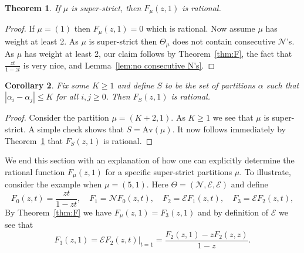 \documentclass{article}
\theoremstyle{plain}
\newtheorem{theorem}{Theorem}[section]
\newtheorem{corollary}[theorem]{Corollary}
\theoremstyle{definition}
\newcommand{\Av}{\text{Av}}
\newcommand{\N}{\mathcal{N}}
\newcommand{\E}{\mathcal{E}}
\begin{document}



\begin{theorem}\label{thm:rational}
	If $\mu$ is super-strict, then $F_\mu(z,1)$ is rational.  
\end{theorem}

\begin{proof}
	If $\mu=(1)$ then $F_\mu(z,1) = 0$ which is rational.  Now assume $\mu$ has weight at least 2.  As $\mu$ is super-strict then $\Theta_\mu$ does not contain consecutive $\N$'s.  As $\mu$ has weight at least 2, our claim follows by Theorem~\ref{thm:F}, the fact that $\frac{zt}{1-zt}$ is very nice, and Lemma~\ref{lem:no consecutive N's}.  
\end{proof}

\begin{corollary}\label{cor:K}
	Fix some $K\geq 1$ and define $S$ to be the set of partitions $\alpha$ such that $|\alpha_i - \alpha_j| \leq K$ for all $i,j\geq 0$.  Then $F_S(z,1)$ is rational.
\end{corollary}
\begin{proof}
	Consider the partition $\mu = (K+2,1)$. As $K\geq 1$ we see that $\mu$ is super-strict.     A simple check shows that $S = \Av(\mu)$.   It now follows immediately by Theorem~\ref{thm:rational} that $F_S(z,1)$ is rational.  
\end{proof}


We end this section with an explanation of how one can explicitly determine the rational function $F_\mu(z,1)$ for a specific super-strict partitions $\mu$.  To illustrate, consider the example when $\mu = (5,1)$.  Here $\Theta = (\N,\E,\E)$ and define
$$F_0(z,t) = \dfrac{zt}{1-zt},\quad F_1 = \N F_0(z,t), \quad F_2 = \E F_1(z,t), \quad F_3 = \E F_2(z,t),$$
By Theorem~\ref{thm:F} we have $F_\mu(z,1) = F_3(z,1)$ and by definition of $\E$ we see that 
$$F_3(z,1) = \left.\E F_2(z,t)\right|_{t=1} = \dfrac{F_2(z,1) - zF_2(z,z) }{1-z}.$$
\end{document}
